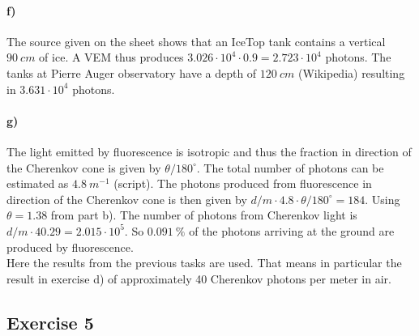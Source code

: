 \documentclass{article}
\begin{document}
\paragraph{f)}
The source given on the sheet shows that an IceTop tank contains a vertical $90\ cm$ of ice. A VEM thus produces $3.026 \cdot 10^4 \cdot 0.9 = 2.723 \cdot 10^4$ photons.
The tanks at Pierre Auger observatory have a depth of $120\ cm$ (Wikipedia) resulting in $3.631 \cdot 10^4$ photons.

\paragraph{g)}
The light emitted by fluorescence is isotropic and thus the fraction in direction of the Cherenkov cone is given by $\theta / 180^\circ$.
The total number of photons can be estimated as $4.8\ m^{-1}$ (script). The photons produced from fluorescence in direction of the Cherenkov cone is then given by $d/m \cdot 4.8 \cdot \theta / 180^\circ = 184$. Using $\theta = 1.38$ from part b).
The number of photons from Cherenkov light is $d/m \cdot 40.29 = 2.015 \cdot 10^5$.
So $0.091\ \%$ of the photons arriving at the ground are produced by fluorescence.\\
Here the results from the previous tasks are used. That means in particular the result in exercise d) of approximately 40 Cherenkov photons per meter in air.

\subsection*{Exercise 5}
\end{document}
